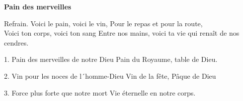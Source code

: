 \textbf{Pain des merveilles}

Refrain.
Voici le pain, voici le vin,
Pour le repas et pour la route,\\
Voici ton corps, voici ton sang
Entre nos mains, voici ta vie qui renaît de nos cendres.

1.
Pain des merveilles de notre Dieu
Pain du Royaume, table de Dieu.

2.
Vin pour les noces de l´homme-Dieu
Vin de la fête, Pâque de Dieu

3.
Force plus forte que notre mort
Vie éternelle en notre corps.

%
